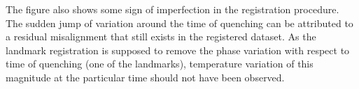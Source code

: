 The figure also shows some sign of imperfection in the registration procedure.
The sudden jump of variation around the time of quenching can be attributed to a residual misalignment that still exists in the registered dataset.
As the landmark registration is supposed to remove the phase variation with respect to time of quenching (one of the landmarks),
temperature variation of this magnitude at the particular time should not have been observed.

